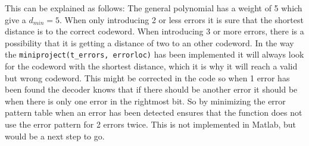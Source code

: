 \documentclass[Main]{subfiles}
\begin{document}
This can be explained as follows:
The general polynomial has a weight of 5 which give a $d_{min}=5$.
When only introducing 2 or less errors it is sure that the shortest distance is to the correct codeword.
When introducing 3 or more errors, there is a possibility that it is getting a distance of two to an other codeword.
In the way the \texttt{miniproject(t\_errors, errorloc)} has been implemented it will always look for the codeword with the shortest distance, which it is why it will reach a valid but wrong codeword.
This might be corrected in the code so when 1 error has been found the decoder knows that if there should be another error it should be when there is only one error in the rightmost bit.
So by minimizing the error pattern table when an error has been detected ensures that the function does not use the error pattern for 2 errors twice.
This is not implemented in Matlab, but would be a next step to go. 
\end{document}
